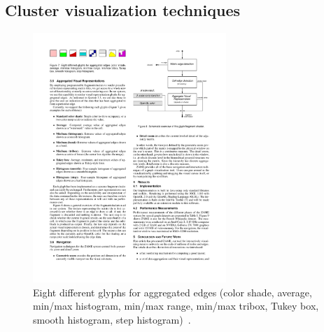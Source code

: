 \subsection{Cluster visualization techniques}
\label{chapter:cluster-vis}



\begin{figure}[h]
  \begin{center}
    \includegraphics[width=0.65\textwidth]{figures/glyphs_zame.pdf}
    \caption{Eight different glyphs for aggregated edges (color shade,
average, min/max histogram, min/max range, min/max tribox, Tukey
box, smooth histogram, step histogram)~\cite{ElmqvistDGHF08}.}
    \label{fig:glyphs-zame}
  \end{center}
\end{figure}